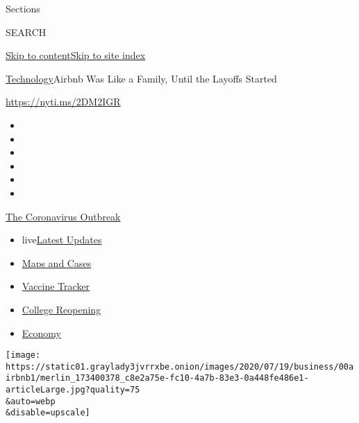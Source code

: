 Sections

SEARCH

\protect\hyperlink{site-content}{Skip to
content}\protect\hyperlink{site-index}{Skip to site index}

\href{/section/technology}{Technology}\textbar{}Airbnb Was Like a
Family, Until the Layoffs Started

\url{https://nyti.ms/2DM2IGR}

\begin{itemize}
\item
\item
\item
\item
\item
\item
\end{itemize}

\href{https://www.nytimes3xbfgragh.onion/news-event/coronavirus?action=click\&pgtype=Article\&state=default\&region=TOP_BANNER\&context=storylines_menu}{The
Coronavirus Outbreak}

\begin{itemize}
\tightlist
\item
  live\href{https://www.nytimes3xbfgragh.onion/2020/08/04/world/coronavirus-cases.html?action=click\&pgtype=Article\&state=default\&region=TOP_BANNER\&context=storylines_menu}{Latest
  Updates}
\item
  \href{https://www.nytimes3xbfgragh.onion/interactive/2020/us/coronavirus-us-cases.html?action=click\&pgtype=Article\&state=default\&region=TOP_BANNER\&context=storylines_menu}{Maps
  and Cases}
\item
  \href{https://www.nytimes3xbfgragh.onion/interactive/2020/science/coronavirus-vaccine-tracker.html?action=click\&pgtype=Article\&state=default\&region=TOP_BANNER\&context=storylines_menu}{Vaccine
  Tracker}
\item
  \href{https://www.nytimes3xbfgragh.onion/2020/08/02/us/covid-college-reopening.html?action=click\&pgtype=Article\&state=default\&region=TOP_BANNER\&context=storylines_menu}{College
  Reopening}
\item
  \href{https://www.nytimes3xbfgragh.onion/live/2020/08/04/business/stock-market-today-coronavirus?action=click\&pgtype=Article\&state=default\&region=TOP_BANNER\&context=storylines_menu}{Economy}
\end{itemize}

\texttt{[image: https://static01.graylady3jvrrxbe.onion/images/2020/07/19/business/00airbnb1/merlin\_173400378\_c8e2a75e-fc10-4a7b-83e3-0a448fe486e1-articleLarge.jpg?quality=75\\\&auto=webp\\\&disable=upscale]}

